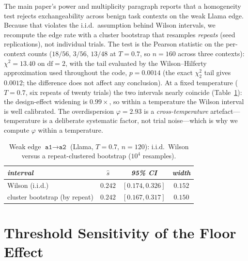 \documentclass[sigconf,anonymous]{aamas}
\begin{document}
The main paper's power and multiplicity paragraph reports that a homogeneity test
rejects exchangeability across benign task contexts on the weak Llama edge. Because
that violates the i.i.d.\ assumption behind Wilson intervals, we recompute the edge
rate with a cluster bootstrap that resamples \emph{repeats} (seed replications), not
individual trials. The test is the Pearson statistic on the
per-context counts ($18/56$, $3/56$, $13/48$ at $T = 0.7$, so $n = 160$ across three
contexts): $\chi^2 = 13.40$ on $\mathrm{df} = 2$, with the tail evaluated by the
Wilson--Hilferty approximation used throughout the code, $p = 0.0014$ (the exact
$\chi^2_2$ tail gives $0.0012$; the difference does not affect any conclusion). At a fixed
temperature ($T = 0.7$, six repeats of twenty trials) the two
intervals nearly coincide (Table~\ref{tab:cluster}): the design-effect widening is
$0.99\times$, so within a temperature the Wilson interval is well calibrated. The
overdispersion $\varphi = 2.93$ is a \emph{cross-temperature} artefact---temperature
is a deliberate systematic factor, not trial noise---which is why we compute
$\varphi$ within a temperature.

\begin{table}[h]
\small
\centering
\caption{Weak edge $\texttt{a1}\to\texttt{a2}$ (Llama, $T = 0.7$, $n = 120$):
i.i.d.\ Wilson versus a repeat-clustered bootstrap ($10^4$ resamples).}
\vspace{10pt} %
\label{tab:cluster}
\begin{tabular}{lccc}
\toprule
\textit{interval} & \textit{$\hat s$} & \textit{95\% CI} & \textit{width} \\
\midrule
Wilson (i.i.d.)              & $0.242$ & $[0.174, 0.326]$ & $0.152$ \\
cluster bootstrap (by repeat) & $0.242$ & $[0.167, 0.317]$ & $0.150$ \\
\bottomrule
\end{tabular}
\end{table}

\section{Threshold Sensitivity of the Floor Effect}
\label{app:tau}
\end{document}
